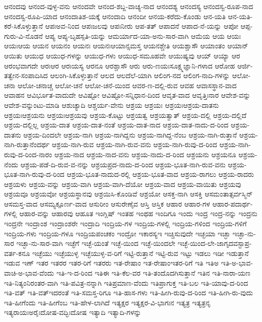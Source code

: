{ಆನಂದವು
ಆನಂದ-ವುಳ್ಳ-ವನು
ಆನಂದವೇ
ಆನಂದ-ಶಬ್ದ-ವಾಚ್ಯ-ನಾದ
ಆನಂದಶ್ಯ
ಆನಂದಸ್ಯ
ಆನಂದಸ್ವ-ರೂಪ-ನಾದ
ಆನಂದಸ್ವ-ರೂಪಿ-ಯಾದ
ಆನಂದಾತಿಶ-ಯಕ್ಕೆ
ಆನಂದಾದಿ
ಆನಂದೀ
ಆನಯ-ಕರೆದು-ಕೊಂಡು
ಆನ-ಯತಿ
ಆನ-ಯತಿ-ಕರೆ-ಸಿಕೊಳ್ಳುತ್ತಾನೆ
ಆಪಃಅವ-ನಿಂದ
ಆಪಃಜಲವು
ಆಪಃನೀರು
ಆಪ-ತತ್
ಆಪಾದನೆ
ಆಪಾದ-ನೆ-ಯನ್ನು
ಆಪೋ
ಆಪ್ಪ-ಗುರು-ವಿ-ನೊಡನೆ
ಆಪ್ಯ
ಆಪ್ಯ-ಬೃಹಸ್ಪತಿ-ಯನ್ನು
ಆಮರ್ಯಾದ-ಯಾ-ಅನು-ಸಾರ-ವಾಗಿ
ಆಮೆಯ
ಆಯ
ಆಯಃ
ಆಯಃಆಯ
ಆಯನ
ಆಯನಂ
ಆಯನಃ
ಆಯನಃಆಯಾನ್ಸಮಸ್ತ
ಆಯನಶ್ಚೇತಿ
ಆಯಶ್ಚಾಸೌ
ಆಯಾಂತಂ
ಆಯಾನ್
ಆಯಿತು
ಆಯುಧ
ಆಯುಧ-ಗಳನ್ನು
ಆಯುಧ-ಗಳು
ಆಯುಧ-ಸಮೂಹವೇ
ಆಯುಷ್ಯವು
ಆಯ್
ಆಯ್ಯಾ
ಆರ
ಆರಂಭವಾಗದೇ
ಆರಃಆರ
ಆರಃಯಸ್ಯ
ಆರನೂ
ಆರಶ್ಚಾಸೌ
ಆರು
ಆರು-ಣಯಃಸೂಕ್ಷ್ಮಜ್ಞಾನಿ-ಗಳಾದ
ಆರೋಹ
ಆರ್ಜಿ-ತತ್ವೇನ-ಸಂಪಾದಿಸಿದ
ಆಲಂಗಿ-ಸಿಕೊಳ್ಳುತ್ತಾನೆ
ಆಲದ
ಆಲದೆಲೆ-ಯಾಗಿ
ಆಲಿಂಗ-ನದ
ಆಲಿಂಗ-ನಾದಿ-ಗಳನ್ನು
ಆಲೋ-ಚನಾ
ಆಲೋ-ಚನಾಚ್ಚ
ಆಲೋ-ಚನೆ
ಆಲೋ-ಚನೆ-ಯಿಂದ
ಆವರ-ಣ-ದಲ್ಲಿ-ರುವ
ಆವಹ
ಆವಾಸಸ್ಥಾನ-ವಾದ
ಆವಾಹನ
ಆವಿರ್ಭೂತ-ವಾದುದೇ
ಆವಿಷ್ಟೋ
ಆವಿಷ್ಟೋ-ಸನ್ನಿಧಾನ-ದಿಂದ
ಆವೃತ-ವಾದ
ಆವೃತ್ತಿಃನಾರ
ಆವೇಶ-ವನ್ನು
ಆವೇಶ-ವನ್ನುಂಟು-ಮಾಡಿ
ಆಶುಚ್ಯಾದಿ
ಆಶ್ಚರ್ಯ-ವೇನು
ಆಶ್ರಯ
ಆಶ್ರಯಃ
ಆಶ್ರಯಃಆಶ್ರಯ-ದಾತನು
ಆಶ್ರಯಃಆಶ್ರಯನು
ಆಶ್ರಯಃಆಶ್ರಯವು
ಆಶ್ರಯ-ಕೊಟ್ಟು
ಆಶ್ರಯತ್ವ
ಆಶ್ರಯತ್ವಾತ್
ಆಶ್ರಯ-ದಲ್ಲಿ
ಆಶ್ರಯ-ದಲ್ಲಿದೆ
ಆಶ್ರಯ-ದಲ್ಲಿಲ್ಲ
ಆಶ್ರಯ-ದಾತ
ಆಶ್ರಯ-ದಾತ-ನಂತೆ
ಆಶ್ರಯ-ದಾತ-ನಾದ
ಆಶ್ರಯ-ದಾತ-ನಾದು-ದ-ರಿಂದ
ಆಶ್ರಯ-ದಾತನು
ಆಶ್ರಯ-ದಿಂದಲೇ
ಆಶ್ರಯ-ನಾಗಿ
ಆಶ್ರಯ-ನಾಗಿದ್ದನು
ಆಶ್ರಯ-ನಾಗಿದ್ದ-ನೆಂಬ
ಆಶ್ರಯ-ನಾಗಿ-ರುತ್ತಾನೆ
ಆಶ್ರಯ-ನಾಗಿ-ರುತ್ತಾನೆಂದರ್ಥ
ಆಶ್ರಯ-ನಾಗಿ-ರುವ
ಆಶ್ರಯ-ನಾಗಿ-ರುವ-ವನು
ಆಶ್ರಯ-ನಾಗಿ-ರುವು-ದ-ರಿಂದ
ಆಶ್ರಯ-ನಾಗಿ-ರುವು-ದ-ರಿಂದ-ನಾರಂ
ಆಶ್ರಯ-ನಾದ
ಆಶ್ರಯ-ನಾದ-ವನು
ಆಶ್ರಯ-ನಾದು-ದ-ರಿಂದ
ಆಶ್ರಯನು
ಆಶ್ರಯನೂ
ಆಶ್ರಯ-ನೆಂದು
ಆಶ್ರಯ-ಪಡೆ-ದಿ-ರುವ-ವ-ನನ್ನು
ಆಶ್ರಯಪ್ರದ-ನಾದು-ದ-ರಿಂದ
ಆಶ್ರಯ-ಭೂತ-ನಾಗಿ-ರುವ-ವನು
ಆಶ್ರಯ-ಭೂತ-ನಾಗಿ-ರುವು-ದ-ರಿಂದ
ಆಶ್ರಯ-ಭೂತ-ನಾದುದ-ರಲ್ಲಿ
ಆಶ್ರಯ-ಭೂತ-ವಾದ
ಆಶ್ರಯ-ರಾಗಲು
ಆಶ್ರಯ-ರಾದರು
ಆಶ್ರಯಳು
ಆಶ್ರಯ-ವನ್ನು
ಆಶ್ರಯ-ವಾಗಿ
ಆಶ್ರಯ-ವಾಗಿ-ದೆಯೋ
ಆಶ್ರಯ-ವಾದ
ಆಶ್ರಯ-ವಾಯಿತು
ಆಶ್ರಯವು
ಆಶ್ರಯವೂ
ಆಶ್ರಯವೋ
ಆಶ್ರಯಸ್ಥಾನವು
ಆಶ್ರಯಿಸಿ-ಕೊಂಡಿವೆ
ಆಶ್ರಯೋ
ಆಸಕ್ತ-ನಾಗಿ
ಆಸಕ್ತಿ
ಆಸಮಂತಾತ್ಸರ್ವಸ್ಮಿನ್
ಆಸಮಸ್ತ-ವಾದ
ಆಸಮ್ಯಕ್ಪೂರ್ಣ-ವಾದ
ಆಸುರೀಂ
ಆಸುರೇಣೈವ
ಆಸ್ತಿ
ಆಸ್ತಿಕ
ಆಹಾರ
ಆಹಾರ-ಗಳ
ಆಹಾರ-ಪದಾರ್ಥ-ಗಳಲ್ಲಿ
ಆಹಾರ-ವನ್ನು
ಆಹಾರವು
ಆಹೂತ
ಇಂಗ್ಲಿಷ್
ಇಂತಹ
ಇಂಥಹ
ಇಂದಿಗೂ
ಇಂದು
ಇಂದ್ರ
ಇಂದ್ರ-ನನ್ನು
ಇಂದ್ರನು
ಇಂದ್ರನೇ
ಇಂದ್ರಾಂಶ
ಇಂದ್ರಾಂಶರೇ
ಇಂದ್ರಾದಿ
ಇಂದ್ರಿಯ-ಗಳ
ಇಂದ್ರಿಯ-ಗಳಲ್ಲಿ
ಇಂದ್ರಿಯ-ಗಳಿಂದ
ಇಂದ್ರಿಯ-ಗಳಿಗೆ
ಇಂದ್ರಿಯ-ಗಳು
ಇಂದ್ರಿಯ-ಗಳೂ
ಇಂದ್ರಿಯಪಂಚಕಂ
ಇಂದ್ರೋ
ಇಕಾರಸ್ಯಇ
ಇಚ್ಚಿಸುವುದೇ
ಇಚ್ಛಯಾ
ಇಚ್ಛಾ
ಇಚ್ಛಾ-ನು-ಸಾರ
ಇಚ್ಛಾ-ನು-ಸಾರ-ವಾಗಿ
ಇಚ್ಛೆಗೆ
ಇಚ್ಛೆ-ಯಂತೆ
ಇಚ್ಛೆ-ಯಿಂದ
ಇಚ್ಛೆ-ಯಿಂದಲೇ
ಇಚ್ಛೆ-ಯಿಂದ-ಲೇ-ಜಾಗೃದವಸ್ಟಾಪ್ರ-ವರ್ತ-ಕನೂ
ಇಚ್ಛೆಯು
ಇಚ್ಛೆಯುಳ್ಳ
ಇಚ್ಛೆಯುಳ್ಳ-ವ-ರಿಗೆ
ಇಟ್ಟಿ-ರುತ್ತಾನೆ
ಇಟ್ಟಿ-ರುವ
ಇಟ್ಟು
ಇಡಲು
ಇಡೀ
ಇಡುತ್ತಾನೆ
ಇಡುವ
ಇಣ್
ಇತರ
ಇತರರ
ಇತರ-ರಿಗೆ
ಇತರರು
ಇತ-ರೇಷಾಂ
ಇತ-ರೇಷಾಂಇತರ-ರಿಗೆ
ಇತಿ
ಇತಿಅ
ಇತಿ-ಅ-ಭಾವ-ವಾಚಿ-ಅ-ಭಾವ-ವೆಂದು
ಇತಿ-ಇ-ದ-ರಿಂದ
ಇತಿಈ
ಇತಿ-ಕೆಲ-ವರ
ಇತಿ-ತಂದೊದಗಿಸುತ್ತಾನೆ
ಇತಿನ
ಇತಿ-ನಾರಾ-ಯಣ
ಇತಿ-ನಿತ್ಯಂನಿರಂತರ-ವಾಗಿ
ಇತಿ-ಪವಿತ್ರ-ನನ್ನಾಗಿ
ಇತಿಪ್ರಮಾಣ-ವೆಂದು
ಇತಿಪ್ರಾಗುಕ್ತ
ಇತಿ-ಬಲ
ಇತಿ-ಯಾವು-ದ-ರಿಂದ
ಇತಿ-ವತ್
ಇತಿ-ವತ್ಇದರಂತೆ
ಇತಿ-ಸಮಸ್ತ-ರಿಗೂ
ಇತಿ-ಹಾಸ-ಗಳು
ಇತಿ-ಹೀಗಿ-ರುವು-ದ-ರಿಂದ
ಇತಿ-ಹೀಗಿ-ರು-ವುದು
ಇತಿ-ಹೀಗೆಂದು
ಇತಿ-ಹೀಗೆಂಬ
ಇತಿ-ಹೇಳ-ಲಾಗಿದೆ
ಇತ್ಯಕ್ಷರ
ಇತ್ಯಕ್ಷರ-ವಿ-ಭಾಗಃನ
ಇತ್ಯತ್ರ
ಇತ್ಯತ್ರನೃ
ಇತ್ಯರಾಯಃಅರೈಃದೋಷ-ವದ್ಭಿಃದೋಷ
ಇತ್ಯಾದಿ
ಇತ್ಯಾದಿ-ಗಳನ್ನು
}
